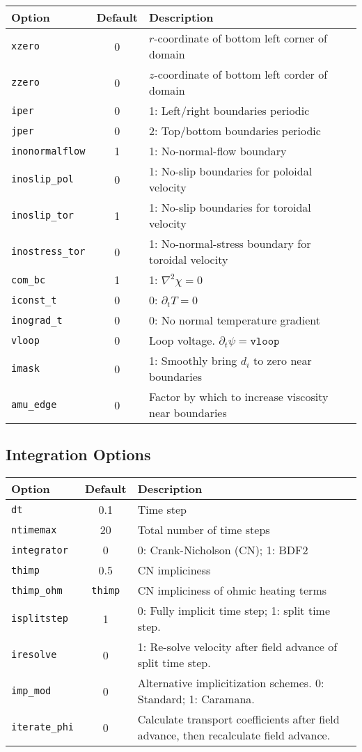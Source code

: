 \documentclass[letterpaper]{book}
\begin{document}
\begin{tabular}{lcp{2.5in}}
  \textbf{Option} & \textbf{Default} & \textbf{Description}\\
  \hline
  \texttt{xzero}  & 0 & $r$-coordinate of bottom left corner of domain\\
  \texttt{zzero}  & 0 & $z$-coordinate of bottom left corder of domain\\
  \texttt{iper}   & 0 & 1: Left/right boundaries periodic\\
  \texttt{jper}   & 0 & 2: Top/bottom boundaries periodic\\
  \texttt{inonormalflow}& 1 & 1: No-normal-flow boundary\\
  \texttt{inoslip\_pol} & 0 & 1: No-slip boundaries for poloidal velocity\\
  \texttt{inoslip\_tor} & 1 & 1: No-slip boundaries for toroidal velocity\\
  \texttt{inostress\_tor}&0 & 1: No-normal-stress boundary for toroidal 
                                 velocity\\
  \texttt{com\_bc}& 1 & 1: $\nabla^2 \chi = 0$\\
  \texttt{iconst\_t}  & 0 & 0: $\partial_t T = 0$\\
  \texttt{inograd\_t} & 0 & 0: No normal temperature gradient\\
  \texttt{vloop}  & 0 & Loop voltage.  $\partial_t \psi = \mathtt{vloop}$\\
  \texttt{imask}  & 0 & 1: Smoothly bring $d_i$ to zero near
    boundaries\\
  \texttt{amu\_edge} & 0 &    Factor by which to increase viscosity near 
                              boundaries
\end{tabular}


\subsection{Integration Options}
\begin{tabular}{lcp{3in}}
  \textbf{Option}&\textbf{Default}&\textbf{Description}\\
  \hline
  \texttt{dt}         & 0.1 & Time step\\
  \texttt{ntimemax}   & 20  & Total number of time steps\\
  \texttt{integrator} & 0   & 0: Crank-Nicholson (CN); 1: BDF2\\
  \texttt{thimp}      & 0.5 & CN impliciness\\
  \texttt{thimp\_ohm} & \texttt{thimp} & 
                              CN impliciness of ohmic heating terms\\
  \texttt{isplitstep} & 1   & 0: Fully implicit time step; 
                              1: split time step.\\
  \texttt{iresolve}   & 0   & 1: Re-solve velocity after 
                              field advance of split time step.\\
  \texttt{imp\_mod}   & 0   & Alternative implicitization
    schemes. 0: Standard; 1: Caramana.\\
  \texttt{iterate\_phi} & 0 & Calculate transport coefficients after
    field advance, then recalculate field advance.
\end{tabular}
\end{document}
